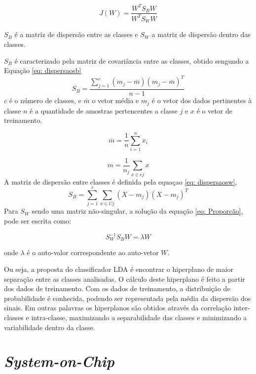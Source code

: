 \begin{equation}
	\label{eq: Proporção}
	J(W) = \frac { W^T S_B W}{W^T S_W W}
\end{equation}

$S_B$ é a matriz de dispersão entre as classes e $ S_W$ a matriz de dispersão dentro das classes. 

$S_B$ é caracterizado pela matriz de covariância entre as classes, obtido sengundo a Equação \ref{eq: dispersaosb} 
\begin{equation}
	\label{eq: dispersaosb}
	 S_B = \frac{\sum_{j=1}^{c} (m_j - \bar m)(m_j -\bar m)^T}{n - 1} 
\end{equation}
$c$ é o número de classes, e $\bar m$ o vetor média e  $m_j$ é o vetor dos dados pertinentes à classe $n$ é a quantidade de amostras pertencentes a classe $j$ e $x$ é o vetor de treinamento.

\begin{equation}
	\label{eq: media}
	\bar m = \frac{1}{n}\sum_{i=1}^{n} {x_i}
\end{equation}

\begin{equation}
	\label{eq: media2}
	m = \frac{1}{n_j}\sum_{x \in c j}^{} x
\end{equation}
A matriz de dispersão entre classes é definida pela equaçao \ref{eq: dispersaosw},
\begin{equation}
	\label{eq: dispersaosw}
	 S_B = \sum_{j=1}^{c} \sum_{x \in C j}{} (X - m_j)(X - m_j)^T 
\end{equation}
Para $S_W$ sendo uma matriz não-singular, a solução da equação 
\ref{eq: Proporção}, pode ser escrita como: 

 \begin{equation}
	\label{eq: final}
	S_W^{-1} S_B W = \lambda W
\end{equation}
 
onde $\lambda$ é o auto-valor correspondente ao auto-vetor $W$.

Ou seja, a proposta do classificador LDA é encontrar o hiperplano de maior separação entre as classes analisadas. O cálculo deste hiperplano é feito a partir dos dados de treinamento. Com os dados de treinamento, a distribuição de probabilidade é conhecida, podendo ser representada pela média da dispersão dos sinais. Em outras palavras os hiperplanos são obtidos através da correlação inter-classes e intra-classe, maximizando a separabilidade das classes e minimizando a variabilidade dentro da classe. 


\section{\textit{System-on-Chip}}

